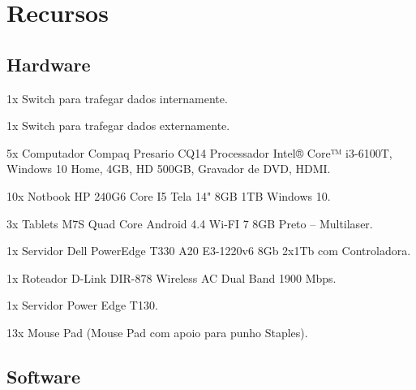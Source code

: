 \chapter[Recursos]{Recursos}

\section[Hardware]{Hardware}

\begin{alineas}
    \item 1x Switch para trafegar dados internamente.
    \item 1x Switch para trafegar dados externamente.
    \item 5x Computador Compaq Presario CQ14 Processador Intel® Core™ i3-6100T, Windows 10 Home, 4GB, HD 500GB, Gravador de DVD, HDMI.
    \item 10x Notbook HP 240G6 Core I5 Tela 14" 8GB 1TB Windows 10.
    \item 3x Tablets M7S Quad Core Android 4.4 Wi-FI 7 8GB Preto – Multilaser.
    \item 1x Servidor Dell PowerEdge T330 A20 E3-1220v6 8Gb 2x1Tb com Controladora.
    \item 1x Roteador D-Link DIR-878 Wireless AC Dual Band 1900 Mbps.
    \item 1x Servidor Power Edge T130.
    \item 13x Mouse Pad (Mouse Pad com apoio para punho Staples).
\end{alineas}

\section[Software]{Software}


